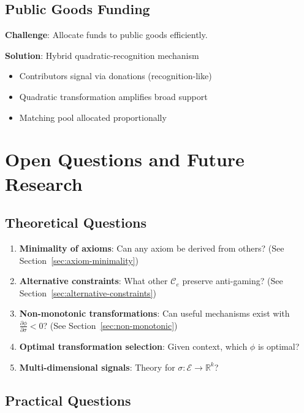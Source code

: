 \documentclass[11pt,a4paper]{article}
\theoremstyle{definition}
\theoremstyle{remark}
\newcommand{\E}{\mathcal{E}}
\begin{document}
\subsection{Public Goods Funding}

\textbf{Challenge}: Allocate funds to public goods efficiently.

\textbf{Solution}: Hybrid quadratic-recognition mechanism
\begin{itemize}
\item Contributors signal via donations (recognition-like)
\item Quadratic transformation amplifies broad support
\item Matching pool allocated proportionally
\end{itemize}

\section{Open Questions and Future Research}

\subsection{Theoretical Questions}

\begin{enumerate}
\item \textbf{Minimality of axioms}: Can any axiom be derived from others? (See Section~\ref{sec:axiom-minimality})

\item \textbf{Alternative constraints}: What other $\mathcal{C}_e$ preserve anti-gaming? (See Section~\ref{sec:alternative-constraints})

\item \textbf{Non-monotonic transformations}: Can useful mechanisms exist with $\frac{\partial \phi}{\partial \sigma} < 0$? (See Section~\ref{sec:non-monotonic})

\item \textbf{Optimal transformation selection}: Given context, which $\phi$ is optimal?

\item \textbf{Multi-dimensional signals}: Theory for $\sigma: \E \to \mathbb{R}^k$?

\end{enumerate}

\subsection{Practical Questions}
\end{document}
